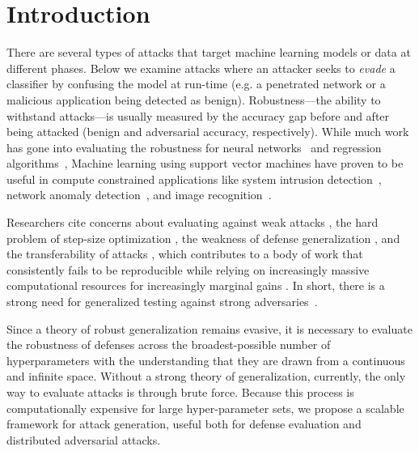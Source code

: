 \documentclass[runningheads]{llncs}
\begin{document}
\section{Introduction}
There are several types of attacks that target machine learning models or data at different phases. Below we examine attacks where an attacker seeks to \emph{evade} a classifier by confusing the model at run-time (e.g. a penetrated network or a malicious application being detected as benign). Robustness---the ability to withstand attacks---is usually measured by the accuracy gap before and after being attacked (benign and adversarial accuracy, respectively).  While much work has gone into evaluating the robustness for neural networks~\cite{szegedy2013intriguing,madry2017towards,croce2020reliable} and regression algorithms~\cite{deka2019adversarial}, 
Machine learning using support vector machines have proven to be useful in compute constrained applications like system intrusion detection~\cite{kim2003network}, network anomaly detection~\cite{mehmood2015svm}, and image recognition~\cite{tzotsos2008support}.


Researchers cite concerns about evaluating against weak attacks \cite{uesato2018adversarial,carlini2019evaluating}, the hard problem of step-size optimization \cite{li2016general}, the weakness of defense generalization \cite{stutz2019confidence}, and the transferability of attacks \cite{demontis2019adversarial}, which contributes to a body of work that consistently fails to be reproducible \cite{croce2020reliable} while  relying on increasingly massive computational resources for increasingly marginal gains \cite{desislavov2021compute}. In short, there is a strong need for generalized testing against strong adversaries~\cite{carlini2019evaluating}.

Since a theory of robust generalization remains evasive, it is necessary to evaluate the robustness of defenses across the broadest-possible number of hyperparameters with the understanding that they are drawn from a continuous and infinite space. Without a strong theory of generalization, currently, the only way to evaluate attacks is through brute force. Because this process is computationally expensive for large hyper-parameter sets, we propose a scalable framework for attack generation, useful both for defense evaluation and distributed adversarial attacks. 

\end{document}
